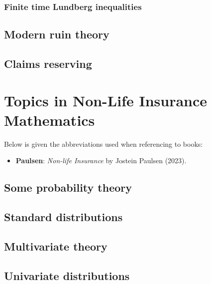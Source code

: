 \documentclass[a4paper,10pt,openany]{book}
\providecommand{\tightlist}{%
 \setlength{\itemsep}{0pt}\setlength{\parskip}{0pt}}
\begin{document}
\hypertarget{finite-time-lundberg-inequalities}{%
\subsection{Finite time Lundberg inequalities}\label{finite-time-lundberg-inequalities}}

\hypertarget{modern-ruin-theory}{%
\section{Modern ruin theory}\label{modern-ruin-theory}}

\hypertarget{claims-reserving}{%
\section{Claims reserving}\label{claims-reserving}}

\hypertarget{topics-in-non-life-insurance-mathematics}{%
\chapter{Topics in Non-Life Insurance Mathematics}\label{topics-in-non-life-insurance-mathematics}}

Below is given the abbreviations used when referencing to books:

\begin{itemize}
\tightlist
\item
  \textbf{Paulsen}: \emph{Non-life Insurance} by Jostein Paulsen (2023).\cite{paulsen2023}
\end{itemize}

\hypertarget{some-probability-theory}{%
\section{Some probability theory}\label{some-probability-theory}}

\hypertarget{standard-distributions}{%
\section{Standard distributions}\label{standard-distributions}}

\hypertarget{multivariate-theory}{%
\section{Multivariate theory}\label{multivariate-theory}}

\hypertarget{univariate-distributions}{%
\section{Univariate distributions}\label{univariate-distributions}}
\end{document}
